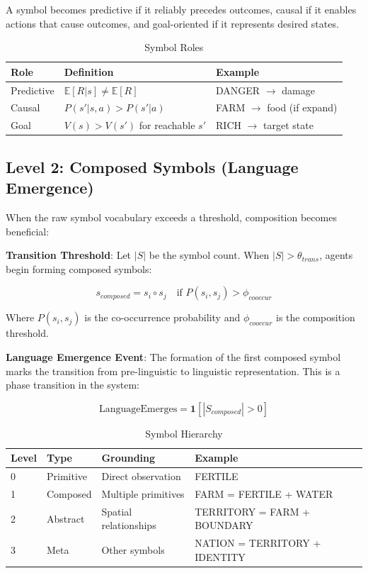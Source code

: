 \documentclass[11pt,a4paper]{article}
\begin{document}
A symbol becomes predictive if it reliably precedes outcomes, causal if it enables actions that cause outcomes, and goal-oriented if it represents desired states.

\begin{table}[htbp]
\centering
\caption{Symbol Roles}
\label{tab:roles}
\begin{tabular}{@{}lll@{}}
\toprule
\textbf{Role} & \textbf{Definition} & \textbf{Example} \\
\midrule
Predictive & $\mathbb{E}[R | s] \neq \mathbb{E}[R]$ & DANGER $\rightarrow$ damage \\
Causal & $P(s' | s, a) > P(s' | a)$ & FARM $\rightarrow$ food (if expand) \\
Goal & $V(s) > V(s')$ for reachable $s'$ & RICH $\rightarrow$ target state \\
\bottomrule
\end{tabular}
\end{table}

\subsection{Level 2: Composed Symbols (Language Emergence)}

When the raw symbol vocabulary exceeds a threshold, composition becomes beneficial:

\textbf{Transition Threshold}: Let $|S|$ be the symbol count. When $|S| > \theta_{trans}$, agents begin forming composed symbols:

\begin{equation}
s_{composed} = s_i \circ s_j \quad \text{if } P(s_i, s_j) > \phi_{cooccur}
\end{equation}

Where $P(s_i, s_j)$ is the co-occurrence probability and $\phi_{cooccur}$ is the composition threshold.

\textbf{Language Emergence Event}: The formation of the first composed symbol marks the transition from pre-linguistic to linguistic representation. This is a phase transition in the system:

\begin{equation}
\text{LanguageEmerges} = \mathbf{1}[|S_{composed}| > 0]
\end{equation}

\begin{table}[htbp]
\centering
\caption{Symbol Hierarchy}
\label{tab:symbols}
\begin{tabular}{@{}llll@{}}
\toprule
Level & Type & Grounding & Example \\
\midrule
0 & Primitive & Direct observation & FERTILE \\
1 & Composed & Multiple primitives & FARM = FERTILE + WATER \\
2 & Abstract & Spatial relationships & TERRITORY = FARM + BOUNDARY \\
3 & Meta & Other symbols & NATION = TERRITORY + IDENTITY \\
\bottomrule
\end{tabular}
\end{table}
\end{document}
